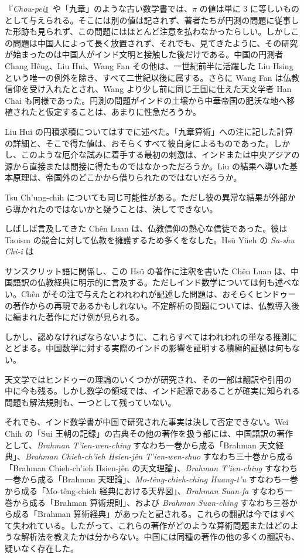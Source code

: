 \documentclass[11pt]{article}
\newcommand{\scanpage}[2]{\clearpage\setcounter{footnote}{0}\noindent{\footnotesize\color{gray}PDF #1 頁 · #2}\par\medskip}
\newcommand{\scanfooter}{}
\begin{document}
『\emph{Chou-pei}』や「九章」のような古い数学書では、$\pi$ の値は単に 3 に等しいものとして与えられる。そこには別の値は記されず、著者たちが円測の問題に従事した形跡も見られず、この問題にはほとんど注意を払わなかったらしい。しかしこの問題は中国人によって長く放置されず、それでも、見てきたように、その研究が始まったのは中国人がインド文明と接触した後だけである。中国の円測者 Chang Hêng、Liu Hui、Wang Fan その他は、一世紀前半に活躍した Liu Hsing という唯一の例外を除き、すべて二世紀以後に属する。さらに Wang Fan は仏教信仰を受け入れたとされ、Wang より少し前に同じ王国に仕えた天文学者 Han Chai も同様であった。円測の問題がインドの土壌から中華帝国の肥沃な地へ移植されたと仮定することは、あまりに性急だろうか。

Liu Hui の円積求積についてはすでに述べた。「九章算術」への注に記した計算の詳細と、そこで得た値は、おそらくすべて彼自身によるものであった。しかし、このような厄介な試みに着手する最初の刺激は、インドまたは中央アジアの源から直接または間接に得たものではなかっただろうか。Liu の結果へ導いた基本原理は、帝国外のどこかから借りられたのではないだろうか。

Tsu Ch'ung-chih についても同じ可能性がある。ただし彼の異常な結果が外部から導かれたのではないかと疑うことは、決してできない。

しばしば言及してきた Chên Luan は、仏教信仰の熱心な信徒であった。彼は Taoism の競合に対して仏教を擁護するため多くをなした。Hsü Yüeh の \emph{Su-shu Chi-i} は
\scanfooter

\scanpage{0072}{第9章、印刷頁58}
サンスクリット語に関係し、この Hsü の著作に注釈を書いた Chên Luan は、中国語訳の仏教経典に明示的に言及する。ただしインド数学については何も述べない。Chên がその注で与えたとわれわれが記述した問題は、おそらくヒンドゥーの著作からの再現であるかもしれない。不定解析の問題については、仏教導入後に編まれた著作にだけ例が見られる。

しかし、認めなければならないように、これらすべてはわれわれの単なる推測にとどまる。中国数学に対する実際のインドの影響を証明する積極的証拠は何もない。

天文学ではヒンドゥーの理論のいくつかが研究され、その一部は翻訳や引用の中に今も残る。しかし数学の領域では、インド起源であることが確実に知られる問題も解法規則も、一つとして残っていない。

それでも、インド数学書が中国で研究された事実は決して否定できない。Wei Chih の「Sui 王朝の記録」の古典その他の著作を扱う部には、中国語訳の著作として、\emph{Brahman T'ien-wen-ching} すなわち一巻から成る「Brahman 天文経典」、\emph{Brahman Chieh-ch'ieh Hsien-jên T'ien-wen-shuo} すなわち三十巻から成る「Brahman Chieh-ch'ieh Hsien-jên の天文理論」、\emph{Brahman T'ien-ching} すなわち一巻から成る「Brahman 天理論」、\emph{Mo-têng-chieh-ching Huang-t'u} すなわち一巻から成る「Mo-têng-chieh 経典における天界図」、\emph{Brahman Suan-fa} すなわち一巻から成る「Brahman 算術規則」、および \emph{Brahman Suan-ching} すなわち三巻から成る「Brahman 算術経典」があったと記される。これらの翻訳は今ではすべて失われている。したがって、これらの著作がどのような算術問題またはどのような解析法を教えたかは分からない。中国には同種の著作の他の多くの翻訳も、疑いなく存在した。
\end{document}
